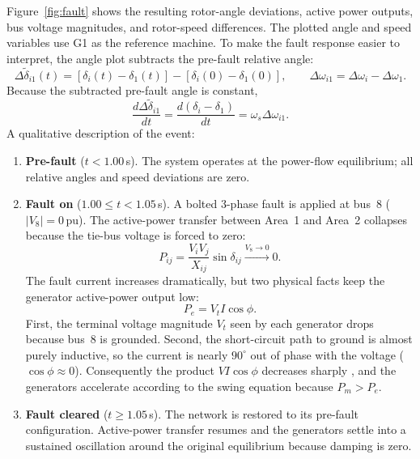 \documentclass[12pt,a4paper]{article}
\begin{document}
Figure~\ref{fig:fault} shows the resulting rotor-angle deviations, active
power outputs, bus voltage magnitudes, and rotor-speed differences. The plotted
angle and speed variables use G1 as the reference machine. To make the fault
response easier to interpret, the angle plot subtracts the pre-fault relative
angle:
\begin{equation}
    \Delta\tilde{\delta}_{i1}(t)
    = \left[\delta_i(t)-\delta_1(t)\right]
    - \left[\delta_i(0)-\delta_1(0)\right],
    \qquad
    \Delta\omega_{i1}=\Delta\omega_i-\Delta\omega_1.
    \label{eq:relative_fault_vars}
\end{equation}
Because the subtracted pre-fault angle is constant,
\begin{equation}
    \frac{d\Delta\tilde{\delta}_{i1}}{dt}
    = \frac{d(\delta_i-\delta_1)}{dt}
    = \omega_s\Delta\omega_{i1}.
\end{equation}
A qualitative description of the event:
\begin{enumerate}
    \item \textbf{Pre-fault} ($t<1.00$\,s). The system operates at the
          power-flow equilibrium; all relative angles and speed deviations
          are zero.
    \item \textbf{Fault on} ($1.00\le t<1.05$\,s). A bolted 3-phase fault
          is applied at bus~8 ($|V_8|=0$\,pu). The active-power transfer
          between Area~1 and Area~2 collapses because the tie-bus voltage
          is forced to zero:
          \begin{equation}
              P_{ij} = \frac{V_i V_j}{X_{ij}}\sin\delta_{ij}
              \xrightarrow{V_8\to0} 0.
          \end{equation}
          The fault current increases dramatically, but two physical facts
          keep the generator active-power output low:
          \begin{equation}
              P_e = V_t I \cos\phi.
              \label{eq:p_active}
          \end{equation}
          First, the terminal voltage magnitude $V_t$ seen by each generator
          drops because bus~8 is grounded. Second, the short-circuit path
          to ground is almost purely inductive, so the current is nearly
          $90^\circ$ out of phase with the voltage ($\cos\phi\approx0$).
          Consequently the product $V I \cos\phi$ decreases sharply
          \cite{industrial:sc_torque}, and the generators accelerate
          according to the swing equation because $P_m>P_e$.
    \item \textbf{Fault cleared} ($t\ge1.05$\,s). The network is restored
          to its pre-fault configuration. Active-power transfer resumes
          and the generators settle into a sustained oscillation around
          the original equilibrium because damping is zero.
\end{enumerate}
\end{document}
